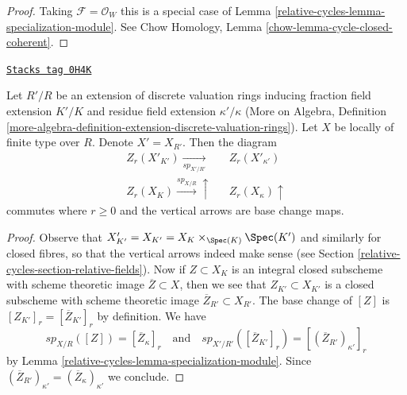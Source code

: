 \begin{proof}
Taking $\mathcal{F} = \mathcal{O}_W$ this is a special case of
Lemma \ref{relative-cycles-lemma-specialization-module}. See
Chow Homology, Lemma \ref{chow-lemma-cycle-closed-coherent}.
\end{proof}

\begin{lemma}
\label{relative-cycles-lemma-specialization-extension}
\href{https://stacks.math.columbia.edu/tag/0H4K}{\texttt{Stacks tag 0H4K}}

Let $R'/R$ be an extension of discrete valuation rings inducing fraction field
extension $K'/K$ and residue field extension $\kappa'/\kappa$
(More on Algebra, Definition
\ref{more-algebra-definition-extension-discrete-valuation-rings}).
Let $X$ be locally of finite type over $R$. Denote $X' = X_{R'}$.
Then the diagram
$$
\begin{array}{ccc}Z_r(X'_{K'}) \underset{sp_{X'/R'}}{\longrightarrow} &  & Z_r(X'_{\kappa'}) \\ Z_r(X_K) \overset{sp_{X/R}}{\longrightarrow}\uparrow &  & Z_r(X_\kappa) \uparrow\end{array}
$$
commutes where $r \geq 0$ and the vertical arrows are base change maps.
\end{lemma}

\begin{proof}
Observe that $X'_{K'} = X_{K'} = X_K \times_{\Spec(K)} \Spec(K')$
and similarly for closed fibres, so that the vertical arrows indeed
make sense (see Section \ref{relative-cycles-section-relative-fields}).
Now if $Z \subset X_K$ is an integral closed subscheme with
scheme theoretic image $\overline{Z} \subset X$, then we see that
$Z_{K'} \subset X_{K'}$ is a closed subscheme with scheme theoretic
image $\overline{Z}_{R'} \subset X_{R'}$. The base change of
$[Z]$ is $[Z_{K'}]_r = [\overline{Z}_{K'}]_r$ by definition. We have
$$
sp_{X/R}([Z]) = [\overline{Z}_\kappa]_r
\quad\text{and}\quad
sp_{X'/R'}([\overline{Z}_{K'}]_r) = [(\overline{Z}_{R'})_{\kappa'}]_r
$$
by Lemma \ref{relative-cycles-lemma-specialization-module}. Since
$(\overline{Z}_{R'})_{\kappa'} = (\overline{Z}_\kappa)_{\kappa'}$
we conclude.
\end{proof}

